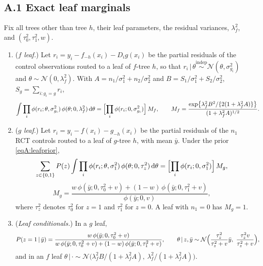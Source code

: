 \documentclass[11pt]{article}
\newcommand{\Normal}{\mathcal{N}}
\newcommand{\given}{\,\vert\,}
\newcommand{\dd}{\mathrm{d}}
\newcommand{\indep}{\stackrel{\text{indep}}{\sim}}
\theoremstyle{definition}
\theoremstyle{plain}
\begin{document}
{\subsection*{A.1 Exact leaf marginals}

\begin{lemA}\label{lem:marg}
Fix all trees other than tree $h$, their leaf parameters, the residual variances, $\lambda_f^2$, and $(\tau_0^2,\tau_1^2,w)$.
\begin{enumerate}[label=(\alph*),leftmargin=2.2em]
\item (\emph{$f$ leaf.}) Let $r_i=y_i-f_{-h}(x_i)-D_ig(x_i)$ be the partial residuals of the control observations routed to a leaf of $f$-tree $h$, so that $r_i\given\theta\indep\Normal(\theta,\sigma^2_{g_i})$ and $\theta\sim\Normal(0,\lambda_f^2)$. With $A=n_1/\sigma_1^2+n_2/\sigma_2^2$ and $B=S_1/\sigma_1^2+S_2/\sigma_2^2$, $S_g=\sum_{i:g_i=g}r_i$,
\begin{equation}
\int\prod_i\phi(r_i;\theta,\sigma^2_{g_i})\,\phi(\theta;0,\lambda_f^2)\,\dd\theta
=\Bigl[\prod_i\phi(r_i;0,\sigma^2_{g_i})\Bigr]\,M_f,\qquad
M_f=\frac{\exp\bigl\{\lambda_f^2B^2/\{2(1+\lambda_f^2A)\}\bigr\}}{(1+\lambda_f^2A)^{1/2}}.
\label{eqA:Mf}
\end{equation}
\item (\emph{$g$ leaf.}) Let $r_i=y_i-f(x_i)-g_{-h}(x_i)$ be the partial residuals of the $n_1$ RCT controls routed to a leaf of $g$-tree $h$, with mean $\bar y$. Under the prior \eqref{eqA:leafprior},
\begin{equation}
\sum_{z\in\{0,1\}}P(z)\int\prod_i\phi(r_i;\theta,\sigma_1^2)\,\phi(\theta;0,\tau_z^2)\,\dd\theta
=\Bigl[\prod_i\phi(r_i;0,\sigma_1^2)\Bigr]\,M_g,
\label{eqA:Mg}
\end{equation}
\begin{equation}
M_g=\frac{w\,\phi(\bar y;0,\tau_0^2+v)+(1-w)\,\phi(\bar y;0,\tau_1^2+v)}{\phi(\bar y;0,v)},
\label{eq:Mg2}
\end{equation}
where $\tau_z^2$ denotes $\tau_0^2$ for $z=1$ and $\tau_1^2$ for $z=0$. A leaf with $n_1=0$ has $M_g=1$.
\item (\emph{Leaf conditionals.}) In a $g$ leaf,
\begin{equation}
P(z=1\given\bar y)=\frac{w\,\phi(\bar y;0,\tau_0^2+v)}{w\,\phi(\bar y;0,\tau_0^2+v)+(1-w)\,\phi(\bar y;0,\tau_1^2+v)},\qquad
\theta\given z,\bar y\sim\Normal\Bigl(\frac{\tau_z^2}{\tau_z^2+v}\bar y,\ \frac{\tau_z^2v}{\tau_z^2+v}\Bigr),
\label{eq:leafcond}
\end{equation}
and in an $f$ leaf $\theta\given\cdot\sim\Normal\bigl(\lambda_f^2B/(1+\lambda_f^2A),\ \lambda_f^2/(1+\lambda_f^2A)\bigr)$.
\end{enumerate}
\end{lemA}

}
\end{document}
